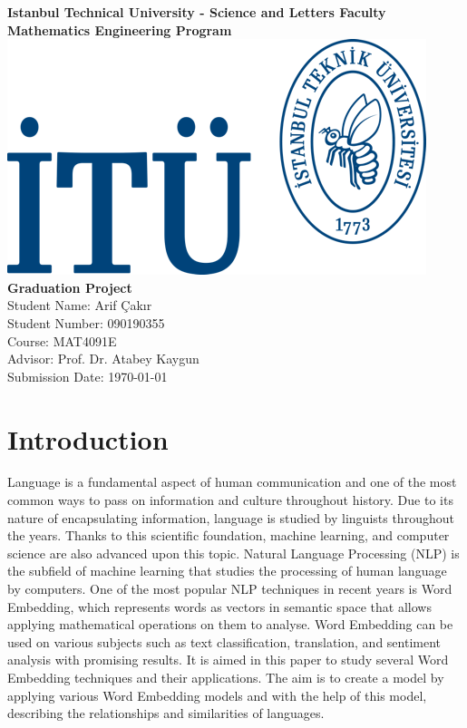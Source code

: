 \documentclass[man]{apa7}
\begin{document}
\begin{titlepage}
\centering
{\large \textbf{ Istanbul Technical University - Science and Letters Faculty}}\\
{\large \textbf{Mathematics Engineering Program}}\\[4\baselineskip]
\includegraphics[scale = 1.5]{itülogo.png}\\[6\baselineskip]
{\LARGE \textbf{Graduation Project}}\\[2\baselineskip]

{\Large Student Name: Arif Çakır}\\
{\large Student Number: 090190355}\\
{\large Course: MAT4091E}\\
{\large Advisor: Prof. Dr. Atabey Kaygun}\\
{\large Submission Date: \today}\\
\end{titlepage}
\tableofcontents
\pagebreak


\section{Introduction}
Language is a fundamental aspect of human communication and one of the most common ways to pass on information and culture throughout history. Due to its nature of encapsulating information, language is studied by linguists throughout the years. Thanks to this scientific foundation, machine learning, and computer science are also advanced upon this topic. Natural Language Processing (NLP) is the subfield of machine learning that studies the processing of human language by computers. One of the most popular NLP techniques in recent years is Word Embedding, which represents words as vectors in semantic space that allows applying mathematical operations on them to analyse. Word Embedding can be used on various subjects such as text classification, translation, and sentiment analysis with promising results. It is aimed in this paper to study several Word Embedding techniques and their applications. The aim is to create a model by applying various Word Embedding models and with the help of this model, describing the relationships and similarities of languages.
\end{document}
